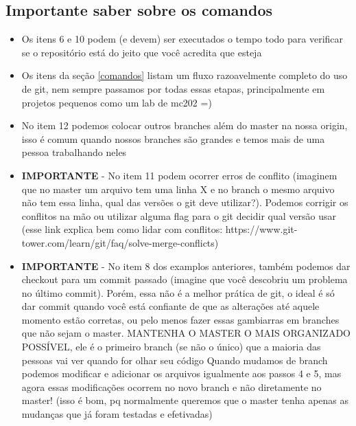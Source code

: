 \documentclass[12pt]{article}
\begin{document}
\begin{doublespacing}
\subsection{Importante saber sobre os comandos}
\begin{itemize}

\item{Os itens 6 e 10 podem (e devem) ser executados o tempo todo para verificar se o repositório está do jeito que você acredita que esteja
}
\item{Os itens da seção \ref{comandos} listam um fluxo razoavelmente completo do uso de git, nem sempre passamos por todas essas etapas, principalmente em projetos pequenos como um lab de mc202 =)
}

\item{No item 12 podemos colocar outros branches além do master na nossa origin, isso é comum quando nossos branches são grandes e temos mais de uma pessoa trabalhando neles
}

\item{\textbf{IMPORTANTE} - No item 11 podem ocorrer erros de conflito (imaginem que no master um arquivo tem uma linha X e no branch o mesmo arquivo não tem essa linha, qual das versões o git deve utilizar?). Podemos corrigir os conflitos na mão ou utilizar alguma flag para o git decidir qual versão usar (esse link explica bem como lidar com conflitos: https://www.git-tower.com/learn/git/faq/solve-merge-conflicts)
}

\item \textbf{IMPORTANTE} - No item 8 dos examplos anteriores, também podemos dar checkout para um commit passado (imagine que você descobriu um problema no último commit). Porém, essa não é a melhor prática de git, o ideal é só dar commit quando você está confiante de que as alterações até aquele momento estão corretas, ou pelo menos fazer essas gambiarras em branches que não sejam o master. MANTENHA O MASTER O MAIS ORGANIZADO POSSÍVEL, ele é o primeiro branch (se não o único) que a maioria das pessoas vai ver quando for olhar seu código
\newline
Quando mudamos de branch podemos modificar e adicionar os arquivos igualmente aos passos 4 e 5, mas agora essas modificações ocorrem no novo branch e não diretamente no master! (isso é bom, pq normalmente queremos que o master tenha apenas as mudanças que já foram testadas e efetivadas)

\label{checkout_c}
\end{itemize}


\end{doublespacing}
\end{document}
